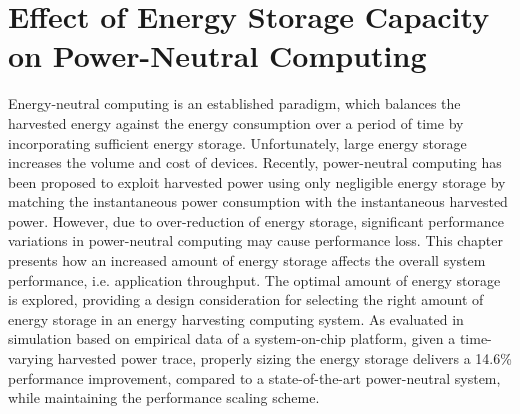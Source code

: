 \chapter{Effect of Energy Storage Capacity on Power-Neutral Computing} \label{Chapter:Work2}



Energy-neutral computing is an established paradigm, which balances the harvested energy against the energy consumption over a period of time by incorporating sufficient energy storage. Unfortunately, large energy storage increases the volume and cost of devices. Recently, power-neutral computing has been proposed to exploit harvested power using only negligible energy storage by matching the instantaneous power consumption with the instantaneous harvested power. However, due to over-reduction of energy storage, significant performance variations in power-neutral computing may cause performance loss. This chapter presents how an increased amount of energy storage affects the overall system performance, i.e. application throughput. The optimal amount of energy storage is explored, providing a design consideration for selecting the right amount of energy storage in an energy harvesting computing system. As evaluated in simulation based on empirical data of a system-on-chip platform, given a time-varying harvested power trace, properly sizing the energy storage delivers a 14.6\% performance improvement, compared to a state-of-the-art power-neutral system, while maintaining the performance scaling scheme. 

